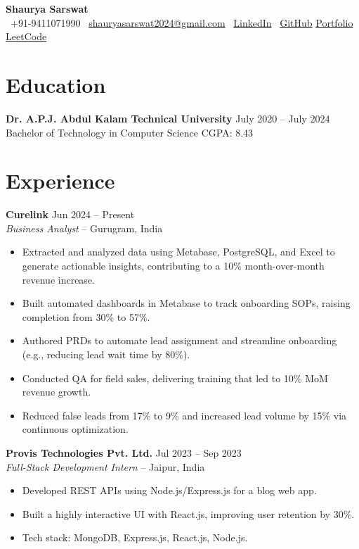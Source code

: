 \documentclass[a4paper,10pt]{article}
\begin{document}
\begin{center}
    {\LARGE \textbf{Shaurya Sarswat}}\\
    \vspace{2pt}
    \faPhone~+91-9411071990 \quad
    \faEnvelope~\href{mailto:shauryasarswat2024@gmail.com}{shauryasarswat2024@gmail.com} \quad
    \faLinkedin~\href{https://linkedin.com/in/ShauryaSarswat}{LinkedIn} \quad
    \faGithub~\href{https://github.com/ShauryaSarswat}{GitHub} \quad
    \href{https://portfolio-silk-alpha-44.vercel.app}{Portfolio} \quad
    \href{https://leetcode.com/ShauryaSarswat}{LeetCode}
\end{center}

\vspace{5pt}

\section*{Education}
\textbf{Dr. A.P.J. Abdul Kalam Technical University} \hfill July 2020 – July 2024 \\
Bachelor of Technology in Computer Science \hfill CGPA: 8.43

\section*{Experience}

\textbf{Curelink} \hfill Jun 2024 – Present \\
\textit{Business Analyst} – Gurugram, India
\begin{itemize}[itemsep=2pt, leftmargin=0pt]
    \item Extracted and analyzed data using Metabase, PostgreSQL, and Excel to generate actionable insights, contributing to a 10\% month-over-month revenue increase.
    \item Built automated dashboards in Metabase to track onboarding SOPs, raising completion from 30\% to 57\%.
    \item Authored PRDs to automate lead assignment and streamline onboarding (e.g., reducing lead wait time by 80\%).
    \item Conducted QA for field sales, delivering training that led to 10\% MoM revenue growth.
    \item Reduced false leads from 17\% to 9\% and increased lead volume by 15\% via continuous optimization.
\end{itemize}

\textbf{Provis Technologies Pvt. Ltd.} \hfill Jul 2023 – Sep 2023 \\
\textit{Full-Stack Development Intern} – Jaipur, India
\begin{itemize}[itemsep=2pt, leftmargin=0pt]
    \item Developed REST APIs using Node.js/Express.js for a blog web app.
    \item Built a highly interactive UI with React.js, improving user retention by 30\%.
    \item Tech stack: MongoDB, Express.js, React.js, Node.js.
\end{itemize}
\end{document}
